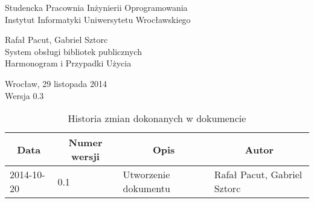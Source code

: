 \documentclass[11pt,a4paper]{article}
\begin{document}
%
%
\begin{center}
	\Large
	Studencka Pracownia Inżynierii Oprogramowania \\[0.5cm]
	Instytut Informatyki Uniwersytetu Wrocławskiego 

	\vspace*{\fill}
	Rafał Pacut, Gabriel Sztorc \\[1cm]
	{\Huge System obsługi bibliotek publicznych} \\[1cm]
	Harmonogram i Przypadki Użycia
	\vspace*{\fill}

	Wrocław, 29 listopada 2014 \\[0.5cm]
	Wersja 0.3
\end{center}
\newpage
{}
\setcounter{page}{2}
%
%

%
%
\begin{table}
\caption{Historia zmian dokonanych w dokumencie}
\begin{tabular}{|l|l|l|l|}
    \hline
    \multicolumn{1}{|c|}{Data} & \multicolumn{1}{c|}{Numer wersji} & 
        \multicolumn{1}{c|}{Opis} & \multicolumn{1}{c|}{Autor} \\
    \hline \hline
    2014-10-20 & 0.1 & Utworzenie dokumentu & Rafał Pacut, Gabriel Sztorc \\
    \hline
\end{tabular}
\end{table}
%
%

\tableofcontents

\newpage
\end{document}
